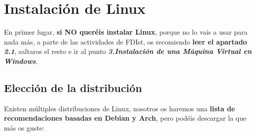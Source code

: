 \newpage
\section{Instalación de Linux}
En primer lugar, \textbf{si NO queréis instalar Linux}, porque no lo vais a usar para nada más, a parte de las actividades de FDIst, os recomiendo \textbf{leer el apartado \textit{2.1}}, saltaros el resto e ir al punto \textbf{\textit{3.Instalación de una Máquina Virtual en Windows}}.

\subsection{Elección de la distribución}
Existen múltiples distribuciones de Linux, nosotros os haremos una \textbf{lista de recomendaciones basadas en Debian y Arch}, pero podéis descargar la que más os guste:
